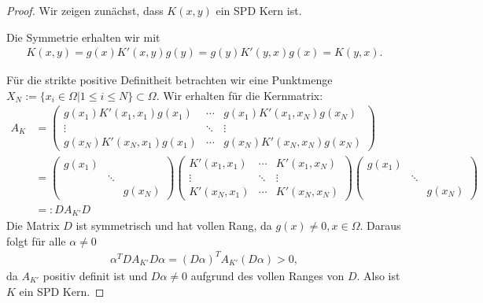 \begin{proof}

Wir zeigen zunächst, dass $K(x,y)$ ein \ac{SPD} Kern ist.

Die Symmetrie erhalten wir mit
\begin{align*}
K(x,y)= g(x)K'(x,y)g(y) = g(y) K'(y,x) g(x) = K(y,x).
\end{align*}

Für die strikte positive Definitheit betrachten wir eine Punktmenge \\
$X_N := \{x_i \in \Omega| 1 \le i \le N \}\subset \Omega$. Wir erhalten für die Kernmatrix:
\begin{align*}
A_K &= 
\begin{pmatrix}
g(x_1)K'(x_1, x_1)g(x_1) & \cdots & g(x_1)K'(x_1, x_N)g(x_N) \\ 
\vdots & \ddots & \vdots \\ 
g(x_N)K'(x_N, x_1)g(x_1) & \cdots & g(x_N)K'(x_N,x_N)g(x_N)
\end{pmatrix}\\
&=
\begin{pmatrix}
g(x_1) &  &  \\ 
& \ddots &  \\ 
&  & g(x_N)
\end{pmatrix} 
\begin{pmatrix}
K'(x_1, x_1) & \cdots & K'(x_1, x_N) \\ 
\vdots & \ddots & \vdots \\ 
K'(x_N, x_1) & \cdots & K'(x_N,x_N)
\end{pmatrix}
\begin{pmatrix}
g(x_1) &  &  \\ 
& \ddots &  \\ 
&  & g(x_N)
\end{pmatrix} \\
&=: D A_{K'} D
\end{align*}
Die Matrix $D$ ist symmetrisch und hat vollen Rang, da $g(x) \neq 0, x \in \Omega$. Daraus folgt für alle $\alpha \neq 0$
\begin{align*}
	\alpha^T D A_{K'} D \alpha = (D \alpha)^T A_{K'} (D \alpha) > 0,
\end{align*}
da $A_{K'}$ positiv definit ist und $D \alpha \neq 0$ aufgrund des vollen Ranges von $D$. Also ist $K$ ein \ac{SPD} Kern.


\end{proof}
